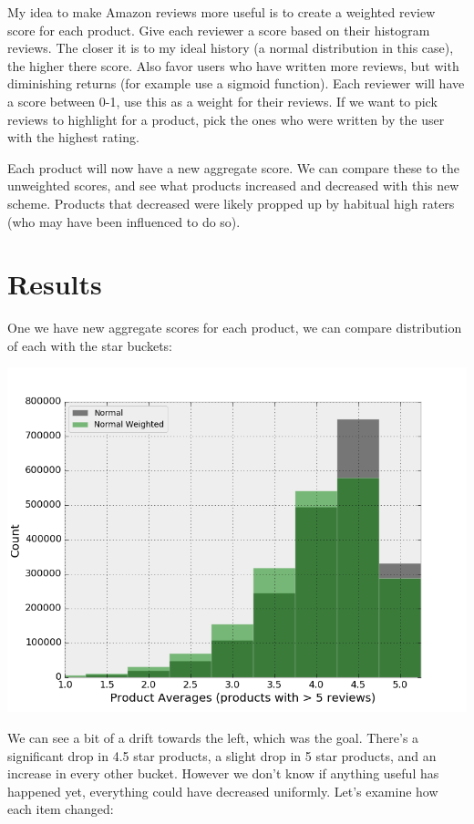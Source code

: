 \documentclass[a4paper,10pt]{article}
\begin{document}
My idea to make Amazon reviews more useful is to create a weighted review score for each product. Give each reviewer a score based on their histogram reviews. The closer it is to my ideal history (a normal distribution in this case), the higher there score. Also favor users who have written more reviews, but with diminishing returns (for example use a sigmoid function). Each reviewer will have a score between 0-1, use this as a weight for their reviews. If we want to pick reviews to highlight for a product, pick the ones who were written by the user with the highest rating.

Each product will now have a new aggregate score. We can compare these to the unweighted scores, and see what products increased and decreased with this new scheme. Products that decreased were likely propped up by habitual high raters (who may have been influenced to do so).

\section*{Results}
One we have new aggregate scores for each product, we can compare distribution of each with the star buckets:
\begin{center}
    \includegraphics[scale=0.65]{normascore_vs_regular.png}
\end{center}

We can see a bit of a drift towards the left, which was the goal. There's a significant drop in 4.5 star products, a slight drop in 5 star products, and an increase in every other bucket. However we don't know if anything useful has happened yet, everything could have decreased uniformly. Let's examine how each item changed:
\end{document}
